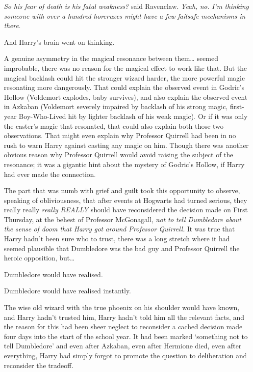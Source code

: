 \emph{So his fear of death is his fatal weakness?} said Ravenclaw. \emph{Yeah,
no. I'm thinking someone with over a hundred horcruxes might have a few
failsafe mechanisms in there.}

And Harry's brain went on thinking.

A genuine asymmetry in the magical resonance between them{\ldots} seemed
improbable, there was no reason for the magical effect to work like that. But
the magical backlash could hit the stronger wizard harder, the more powerful
magic resonating more dangerously. That could explain the observed event in
Godric's Hollow (Voldemort explodes, baby survives), and also explain the
observed event in Azkaban (Voldemort severely impaired by backlash of his
strong magic, first-year Boy-Who-Lived hit by lighter backlash of his weak
magic). Or if it was only the caster's magic that resonated, that could also
explain both those two observations. That might even explain why Professor
Quirrell had been in no rush to warn Harry against casting any magic on him.
Though there was another obvious reason why Professor Quirrell would avoid
raising the subject of the resonance; it was a gigantic hint about the mystery
of Godric's Hollow, if Harry had ever made the connection.

The part that was numb with grief and guilt took this opportunity to observe,
speaking of obliviousness, that after events at Hogwarts had turned serious,
they really really \emph{really REALLY} should have reconsidered the decision
made on First Thursday, at the behest of Professor McGonagall, \emph{not to
tell Dumbledore about the sense of doom that Harry got around Professor
Quirrell.} It was true that Harry hadn't been sure who to trust, there was a
long stretch where it had seemed plausible that Dumbledore was the bad guy and
Professor Quirrell the heroic opposition, but{\ldots}

Dumbledore would have realised.

Dumbledore would have realised instantly.

The wise old wizard with the true phoenix on his shoulder would have known, and
Harry hadn't trusted him, Harry hadn't told him all the relevant facts, and the
reason for this had been sheer neglect to reconsider a cached decision made
four days into the start of the school year. It had been marked `something not
to tell Dumbledore' and even after Azkaban, even after Hermione died, even
after everything, Harry had simply forgot to promote the question to
deliberation and reconsider the tradeoff.

